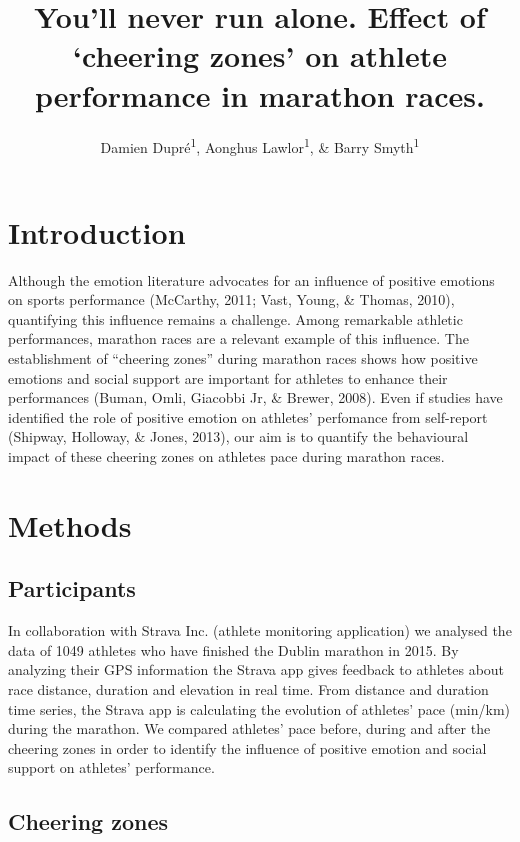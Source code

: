 \documentclass[,man]{apa6}
\title{You'll never run alone. Effect of `cheering zones' on athlete
performance in marathon races.}
\author{Damien Dupré\textsuperscript{1}, Aonghus Lawlor\textsuperscript{1}, \&
Barry Smyth\textsuperscript{1}}
\date{}
\affiliation{
\vspace{0.5cm}
\textsuperscript{1} University College Dublin}
\theoremstyle{definition}
\theoremstyle{definition}
\theoremstyle{definition}
\theoremstyle{remark}
\begin{document}
\maketitle

\section{Introduction}\label{introduction}

Although the emotion literature advocates for an influence of positive
emotions on sports performance (McCarthy, 2011; Vast, Young, \& Thomas,
2010), quantifying this influence remains a challenge. Among remarkable
athletic performances, marathon races are a relevant example of this
influence. The establishment of \enquote{cheering zones} during marathon
races shows how positive emotions and social support are important for
athletes to enhance their performances (Buman, Omli, Giacobbi Jr, \&
Brewer, 2008). Even if studies have identified the role of positive
emotion on athletes' perfomance from self-report (Shipway, Holloway, \&
Jones, 2013), our aim is to quantify the behavioural impact of these
cheering zones on athletes pace during marathon races.

\section{Methods}\label{methods}

\subsection{Participants}\label{participants}

In collaboration with Strava Inc. (athlete monitoring application) we
analysed the data of 1049 athletes who have finished the Dublin marathon
in 2015. By analyzing their GPS information the Strava app gives
feedback to athletes about race distance, duration and elevation in real
time. From distance and duration time series, the Strava app is
calculating the evolution of athletes' pace (min/km) during the
marathon. We compared athletes' pace before, during and after the
cheering zones in order to identify the influence of positive emotion
and social support on athletes' performance.

\subsection{Cheering zones}\label{cheering-zones}
\end{document}
